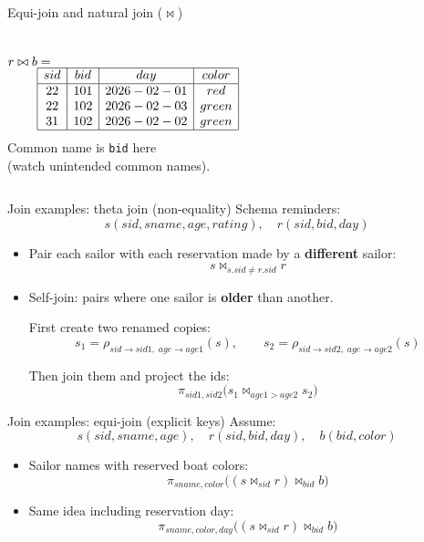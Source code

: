 \documentclass[10pt,aspectratio=169]{beamer}
\newcommand{\proj}{\pi}
\newcommand{\rename}{\rho}
\begin{document}
\begin{frame}{Equi-join and natural join \texorpdfstring{($\bowtie$)}{(bowtie)}}
\begin{columns}[T,onlytextwidth]
\vspace{0.2em}
\scriptsize
\[
\begin{aligned}
r \bowtie b &=\\[-0.6em]
&\begin{array}{|c|c|c|c|}\hline
sid&bid&day&color\\\hline
22&101&2026-02-01&red\\
22&102&2026-02-03&green\\
31&102&2026-02-02&green\\\hline
\end{array}
\end{aligned}
\]
\scriptsize \quad \qquad Common name is \texttt{bid} here \\
\quad \qquad (watch unintended common names).
\end{columns}
\end{frame}


\begin{frame}{Join examples: theta join (non-equality)}
\small
Schema reminders:
\[
s(sid,sname,age,rating),\quad r(sid,bid,day)
\]

\begin{itemize}
  \item Pair each sailor with each reservation made by a \textbf{different} sailor:
  \[
  s \Join_{s.sid \neq r.sid} r
  \]

  \item Self-join: pairs where one sailor is \textbf{older} than another.

  \smallskip
  First create two renamed copies:
  \[
  s_1=\rename_{sid\rightarrow sid1,\;age\rightarrow age1}(s),\qquad
  s_2=\rename_{sid\rightarrow sid2,\;age\rightarrow age2}(s)
  \]

  Then join them and project the ids:
  \[
  \proj_{sid1,sid2}\big(s_1 \Join_{age1>age2} s_2\big)
  \]
\end{itemize}
\end{frame}


\begin{frame}{Join examples: equi-join (explicit keys)}
\small
Assume:
\[
s(sid,sname,age),\quad r(sid,bid,day),\quad b(bid,color)
\]
\begin{itemize}
  \item Sailor names with reserved boat colors:
  \[
  \proj_{sname,color}\big((s \Join_{sid} r)\Join_{bid} b\big)
  \]
  \item Same idea including reservation day:
  \[
  \proj_{sname,color,day}\big((s \Join_{sid} r)\Join_{bid} b\big)
  \]
\end{itemize}
\end{frame}
\end{document}
